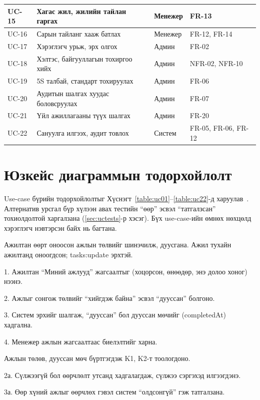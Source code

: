 \begin{longtable}{|p{1.4cm}|L{6.6cm}|L{2.6cm}|L{3.8cm}|}
UC-15 & Хагас жил, жилийн тайлан гаргах & Менежер & FR-13 \\ \hline
UC-16 & Сарын тайланг хааж батлах & Менежер & FR-12, FR-14 \\ \hline
UC-17 & Хэрэглэгч урьж, эрх олгох & Админ & FR-02 \\ \hline
UC-18 & Хэлтэс, байгууллагын тохиргоо хийх & Админ & NFR-02, NFR-10 \\ \hline
UC-19 & 5S талбай, стандарт тохируулах & Админ & FR-06 \\ \hline
UC-20 & Аудитын шалгах хуудас боловсруулах & Админ & FR-07 \\ \hline
UC-21 & Үйл ажиллагааны түүх шалгах & Админ & FR-20 \\ \hline
UC-22 & Сануулга илгээх, аудит товлох & Систем & FR-05, FR-06, FR-12 \\ \hline
\end{longtable}

\section{Юзкейс диаграммын тодорхойлолт}
Use-case бүрийн тодорхойлолтыг Хүснэгт~\ref{table:uc01}--\ref{table:uc22}-д харуулав~\cite{cockburn}. Алтернатив урсгал бүр хүлээн авах тестийн ``өөр'' эсвэл ``татгалзсан'' тохиолдолтой харгалзана (\ref{sec:uctests}-р хэсэг). Бүх use-case-ийн өмнөх нөхцөлд хэрэглэгч нэвтэрсэн байх нь багтана.

{Ажилтан өөрт оноосон ажлын төлвийг шинэчилж, дуусгана.}
{Ажил тухайн ажилтанд оноогдсон; tasks:update эрхтэй.}
{1. Ажилтан ``Миний ажлууд'' жагсаалтыг (хоцорсон, өнөөдөр, энэ долоо хоног) нээнэ.\par
 2. Ажлыг сонгож төлвийг ``хийгдэж байна'' эсвэл ``дууссан'' болгоно.\par
 3. Систем эрхийг шалгаж, ``дууссан'' бол дууссан мөчийг (completedAt) хадгална.\par
 4. Менежер ажлын жагсаалтаас биелэлтийг харна.}
{Ажлын төлөв, дууссан мөч бүртгэгдэж K1, K2-т тоологдоно.}
{2а. Сүлжээгүй бол өөрчлөлт утсанд хадгалагдаж, сүлжээ сэргэхэд илгээгдэнэ.\par
 3а. Өөр хүний ажлыг өөрчлөх гэвэл систем ``олдсонгүй'' гэж татгалзана.}

